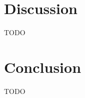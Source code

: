 \documentclass{svproc}
\begin{document}
\section{Discussion}\label{sec:discussion}
TODO

\section{Conclusion}\label{sec:conclusion}
TODO



\end{document}
